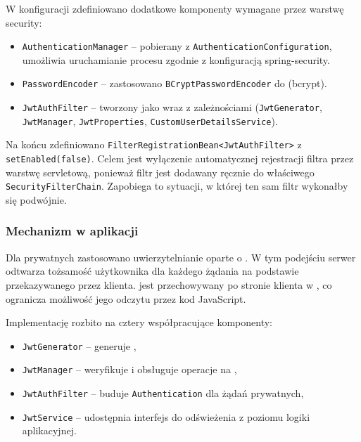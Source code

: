 
W konfiguracji zdefiniowano dodatkowe komponenty wymagane przez warstwę security:
\begin{itemize}
    \item \texttt{AuthenticationManager} -- pobierany z \texttt{AuthenticationConfiguration},
    umożliwia uruchamianie procesu  zgodnie z konfiguracją \gls{spring-security}.
    \item \texttt{PasswordEncoder} -- zastosowano \texttt{BCryptPasswordEncoder} do  (\gls{bcrypt}).
    \item \texttt{JwtAuthFilter} -- tworzony jako  wraz z zależnościami
    (\texttt{JwtGenerator}, \texttt{JwtManager}, \texttt{JwtProperties}, \texttt{CustomUserDetailsService}).
\end{itemize}


Na końcu zdefiniowano \texttt{FilterRegistrationBean<JwtAuthFilter>} z \newline \texttt{setEnabled(false)}.
Celem jest wyłączenie automatycznej rejestracji filtra przez warstwę servletową,
ponieważ filtr  jest dodawany ręcznie do właściwego \newline \texttt{SecurityFilterChain}.
Zapobiega to sytuacji, w której ten sam filtr wykonałby się podwójnie.


\subsubsection{Mechanizm  w aplikacji}
\label{subsubsec:mechanizm-jwt}

Dla  prywatnych zastosowano \gls{uwierzytelnianie} oparte o  .
W tym podejściu serwer odtwarza tożsamość użytkownika dla każdego żądania
na podstawie  przekazywanego przez klienta.  jest przechowywany po stronie klienta
w , co ogranicza możliwość jego odczytu przez kod JavaScript.

Implementację rozbito na cztery współpracujące komponenty:
\begin{itemize}
    \item \texttt{JwtGenerator} -- generuje ,
    \item \texttt{JwtManager} -- weryfikuje  i obsługuje operacje na ,
    \item \texttt{JwtAuthFilter} -- buduje \texttt{Authentication} dla żądań prywatnych,
    \item \texttt{JwtService} -- udostępnia interfejs do odświeżenia  z poziomu logiki aplikacyjnej.
\end{itemize}


